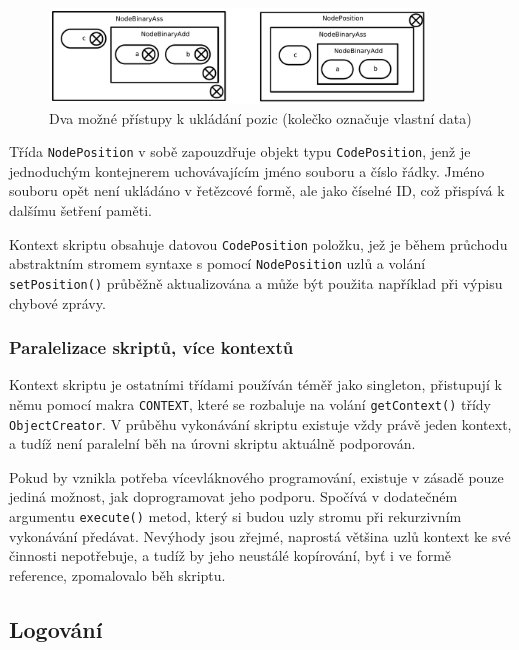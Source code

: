 \documentclass[11pt,twoside,a4paper]{book}
\begin{document}
\begin{figure}[ht]
\begin{center}
\includegraphics[width=10cm]{img/nodeposition.pdf}
\caption{Dva možné přístupy k ukládání pozic (kolečko označuje vlastní data)}
\label{fig:nodeposition}
\end{center}
\end{figure}

Třída \texttt{NodePosition} v sobě zapouzdřuje objekt typu \texttt{CodePosition}, jenž je jednoduchým kontejnerem uchovávajícím jméno souboru a číslo řádky. Jméno souboru opět není ukládáno v řetězcové formě, ale jako číselné ID, což přispívá k dalšímu šetření paměti.

Kontext skriptu obsahuje datovou \texttt{CodePosition} položku, jež je během průchodu abs\-trakt\-ním stromem syntaxe s pomocí \texttt{NodePosition} uzlů a volání \texttt{setPosition()} průběžně aktualizována a může být použita například při výpisu chybové zprávy.


\subsubsection{Paralelizace skriptů, více kontextů}

Kontext skriptu je ostatními třídami používán téměř jako singleton, přistupují k němu pomocí makra \texttt{CONTEXT}, které se rozbaluje na volání \texttt{getContext()} třídy \texttt{ObjectCreator}. V průběhu vykonávání skriptu existuje vždy právě jeden kontext, a tudíž není paralelní běh na úrovni skriptu aktuálně podporován.

Pokud by vznikla potřeba vícevláknového programování, existuje v zásadě pouze jediná mož\-nost, jak doprogramovat jeho podporu. Spočívá v dodatečném argumentu \texttt{execute()} metod, který si budou uzly stromu při rekurzivním vykonávání předávat. Nevýhody jsou zřejmé, naprostá většina uzlů kontext ke své činnosti nepotřebuje, a tudíž by jeho neustálé kopírování, byť i ve formě reference, zpomalovalo běh skriptu.


\subsection{Logování}
\end{document}
